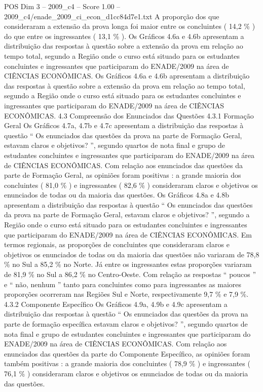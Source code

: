 \begin{textsample}{POS Dim 3 – 2009\_c4 – Score 1.00 – 2009\_c4/enade\_2009\_ci\_econ\_d1cc84d7e1.txt}
A proporção dos que consideraram a extensão da prova longa foi maior entre os concluintes ( 14,2 \% ) do que entre os ingressantes ( 13,1 \% ).
Os Gráficos 4.6a e 4.6b apresentam a distribuição das respostas à questão sobre a extensão da prova em relação ao tempo total, segundo a Região onde o curso está situado para os estudantes concluintes e ingressantes que participaram do ENADE/2009 na área de CIÊNCIAS ECONÔMICAS.
Os Gráficos 4.6a e 4.6b apresentam a distribuição das respostas à questão sobre a extensão da prova em relação ao tempo total, segundo a Região onde o curso está situado para os estudantes concluintes e ingressantes que participaram do ENADE/2009 na área de CIÊNCIAS ECONÔMICAS. 4.3 Compreensão dos Enunciados das Questões 4.3.1 Formação Geral Os Gráficos 4.7a, 4.7b e 4.7c apresentam a distribuição das respostas à questão “ Os enunciados das questões da prova na parte de Formação Geral, estavam claros e objetivos? ”, segundo quartos de nota final e grupo de estudantes concluintes e ingressantes que participaram do ENADE/2009 na área de CIÊNCIAS ECONÔMICAS.
Com relação aos enunciados das questões da parte de Formação Geral, as opiniões foram positivas : a grande maioria dos concluintes ( 81,0 \% ) e ingressantes ( 82,6 \% ) consideraram claros e objetivos os enunciados de todas ou da maioria das questões.
Os Gráficos 4.8a e 4.8b apresentam a distribuição das respostas à questão “ Os enunciados das questões da prova na parte de Formação Geral, estavam claros e objetivos? ”, segundo a Região onde o curso está situado para os estudantes concluintes e ingressantes que participaram do ENADE/2009 na área de CIÊNCIAS ECONÔMICAS.
Em termos regionais, as proporções de concluintes que consideraram claros e objetivos os enunciados de todas ou da maioria das questões não variaram de 78,8 \% no Sul a 85,2 \% no Norte.
Já entre os ingressantes estas proporções variaram de 81,9 \% no Sul a 86,2 \% no Centro-Oeste.
Com relação as respostas “ poucos ” e “ não, nenhum ” tanto para concluintes como para ingressantes as maiores proporções ocorreram nas Regiões Sul e Norte, respectivamente 9,7 \% e 7,9 \%. 4.3.2 Componente Específico Os Gráficos 4.9a, 4.9b e 4.9c apresentam a distribuição das respostas à questão “ Os enunciados das questões da prova na parte de formação específica estavam claros e objetivos? ”, segundo quartos de nota final e grupo de estudantes concluintes e ingressantes que participaram do ENADE/2009 na área de CIÊNCIAS ECONÔMICAS.
Com relação aos enunciados das questões da parte do Componente Específico, as opiniões foram também positivas : a grande maioria dos concluintes ( 78,9 \% ) e ingressantes ( 76,1 \% ) consideraram claros e objetivos os enunciados de todas ou da maioria das questões.

\end{textsample}
